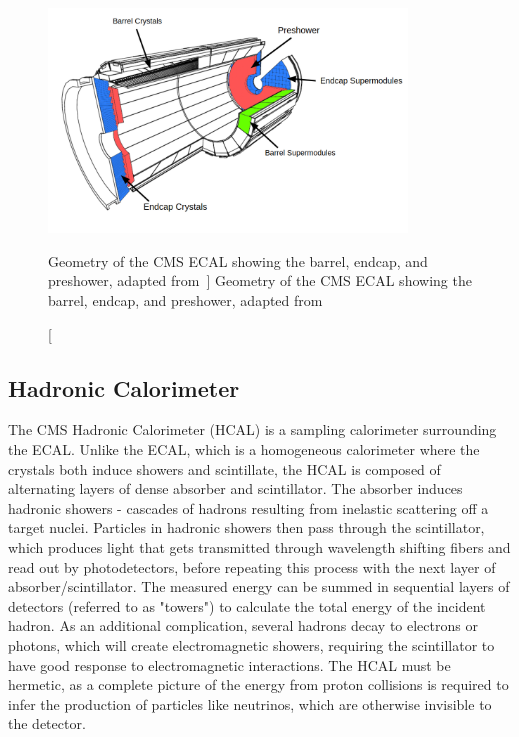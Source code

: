 \begin{figure}[htpb]
	\centering
	\includegraphics[width=0.85\textwidth]{figs/03_experiment/cms_ecal.pdf}
	\caption
	[Geometry of the CMS ECAL showing the barrel, endcap, and preshower, adapted from~\cite{Marzocchi2019}]
	{Geometry of the CMS ECAL showing the barrel, endcap, and preshower, adapted from~\cite{Marzocchi2019}}
	\label{fig:ecal}
\end{figure}


\subsection{Hadronic Calorimeter} \label{sec:CMS_HCAL}
The CMS Hadronic Calorimeter (HCAL) is a sampling calorimeter surrounding the ECAL. Unlike the ECAL, which is a homogeneous calorimeter where the crystals both induce showers and scintillate, the HCAL is composed of alternating layers of dense absorber and scintillator. The absorber induces hadronic showers - cascades of hadrons resulting from inelastic scattering off a target nuclei. Particles in hadronic showers then pass through the scintillator, which produces light that gets transmitted through wavelength shifting fibers and read out by photodetectors, before repeating this process with the next layer of absorber/scintillator. The measured energy can be summed in sequential layers of detectors (referred to as "towers") to calculate the total energy of the incident hadron. As an additional complication, several hadrons decay to electrons or photons, which will create electromagnetic showers, requiring the scintillator to have good response to electromagnetic interactions. The HCAL must be hermetic, as a complete picture of the energy from proton collisions is required to infer the production of particles like neutrinos, which are otherwise invisible to the detector.

